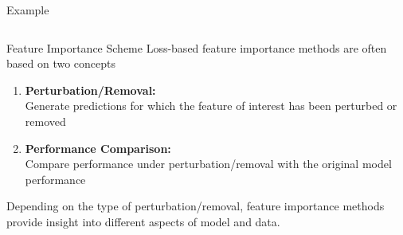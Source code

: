 \documentclass[11pt,compress,t,notes=noshow, aspectratio=169, xcolor=table]{beamer}
\begin{document}
\begin{frame}{Example}
\begin{columns}[c]
\begin{column}{0.63\textwidth}
\end{column}
\end{columns}

\end{frame}

\begin{frame}{Feature Importance Scheme}
Loss-based feature importance methods are often based on two concepts
\lz
\begin{enumerate}
  \item \textbf{Perturbation/Removal:}\\
  Generate predictions for which the feature of interest has been perturbed or removed
  \item \textbf{Performance Comparison:} \\
  Compare performance under perturbation/removal with the original model performance
\end{enumerate}
\lz
Depending on the type of perturbation/removal, feature importance methods provide insight into different aspects of model and data.
\end{frame}
\end{document}
